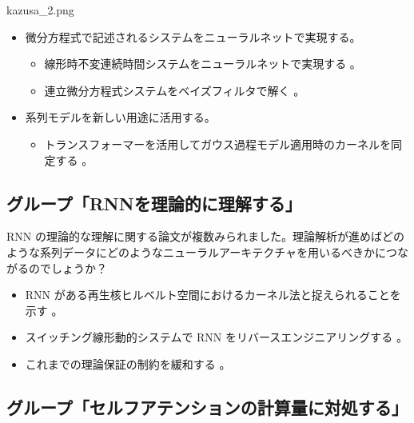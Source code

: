 \documentclass[b5paper,xelatex,ja=standard,10pt]{bxjsarticle}
\begin{document}
\begin{SERIFU}[colback=PaleIris]{kazusa_2.png}
\begin{itemize}
  \vspace{5pt}
  \item 微分方程式で記述されるシステムをニューラルネットで実現する。
  \begin{itemize}
    \item 線形時不変連続時間システムをニューラルネットで実現する \cite{01_Gu2021}。
    \item 連立微分方程式システムをベイズフィルタで解く \cite{13_Schmidt2021}。
  \end{itemize}
  
  \vspace{5pt}
  \item 系列モデルを新しい用途に活用する。
  \begin{itemize}
    \item トランスフォーマーを活用してガウス過程モデル適用時のカーネルを同定する \cite{12_Simpson2021}。
  \end{itemize}
\end{itemize}
\end{SERIFU}

\subsection*{グループ「RNNを理論的に理解する」}

RNN の理論的な理解に関する論文が複数みられました。理論解析が進めばどのような系列データにどのようなニューラルアーキテクチャを用いるべきかにつながるのでしょうか？

\begin{itemize}
  \item RNN がある再生核ヒルベルト空間におけるカーネル法と捉えられることを示す \cite{05_Fermanian2021}。
  \item スイッチング線形動的システムで RNN をリバースエンジニアリングする \cite{18_Smith2021}。
  \item これまでの理論保証の制約を緩和する \cite{21_Wang2021} \cite{22_Panigrahi2021}。
\end{itemize}

\subsection*{グループ「セルフアテンションの計算量に対処する」}
\end{document}
